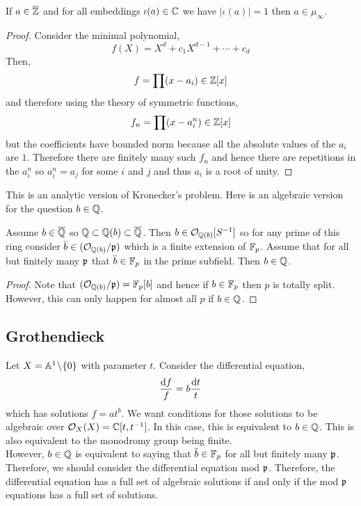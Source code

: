 \documentclass[12pt]{article}
\begin{document}
\begin{prop}[Kronecker]
If $a \in \overline{\mathbb{Z}}$ and for all embeddings $\iota(a) \in \mathbb{C}$ we have $|\iota(a)| = 1$ then $a \in \mu_{\infty}$.
\end{prop}

\begin{proof}
Consider the minimal polynomial,
\[ f(X) = X^d + c_1 X^{d-1} + \cdots + c_d \]
Then,
\[ f = \prod (x - a_i) \in \mathbb{Z}[x] \]
and therefore using the theory of symmetric functions,
\[ f_n = \prod (x - a_i^n) \in \mathbb{Z}[x] \]
but the coefficients have bounded norm because all the absolute values of the $a_i$ are $1$. Therefore there are finitely many such $f_n$ and hence there are repetitions in the $a_i^n$ so $a_i^n = a_j$ for some $i$ and $j$ and thus $a_i$ is a root of unity. 
\end{proof}

\begin{rmk}
This is an analytic version of Kronecker's problem. Here is an algebraic version for the question $b \in \mathbb{Q}$. 
\end{rmk}

\begin{theorem}
Assume $b \in \overline{\mathbb{Q}}$ so $\mathbb{Q} \subset \mathbb{Q}(b) \subset \overline{\mathbb{Q}}$. Then $b \in \mathcal{O}_{\mathbb{Q}(b)}[S^{-1}]$ so for any prime of this ring consider $\bar{b} \in (\mathcal{O}_{\mathbb{Q}(b)} / \mathfrak{p})$ which is a finite extension of $\mathbb{F}_p$. Assume that for all but finitely many $\mathfrak{p}$ that $\bar{b} \in \mathbb{F}_p$ in the prime subfield. Then $b \in \mathbb{Q}$.
\end{theorem}

\begin{proof}
Note that $(\mathcal{O}_{\mathbb{Q}(b)} / \mathfrak{p}) = \mathbb{F}_p[b]$ and hence if $b \in \mathbb{F}_p$ then $p$ is totally split. However, this can only happen for almost all $p$ if $b \in \mathbb{Q}$.
\end{proof}

\subsection{Grothendieck}

Let $X = \mathbb{A}^1 \! \setminus \! \{ 0 \}$ with parameter $t$. Consider the differential equation,
\[ \frac{\mathrm{d}{f}}{f} = b \frac{\mathrm{d}{t}}{t} \]
which has solutions $f = a t^b$. We want conditions for those solutions to be algebraic over $\mathcal{O}_{X}(X) = \mathbb{C}[t, t^{-1}]$. In this case, this is equivalent to $b \in \mathbb{Q}$. This is also equivalent to the monodromy group being finite. 
\bigskip\\
However, $b \in \mathbb{Q}$ is equivalent to saying that $\bar{b} \in \mathbb{F}_p$ for all but finitely many $\mathfrak{p}$. Therefore, we should consider the differential equation mod $\mathfrak{p}$. Therefore, the differential equation has a full set of algebraic solutions if and only if the mod $\mathfrak{p}$ equations has a full set of solutions. 
\end{document}
